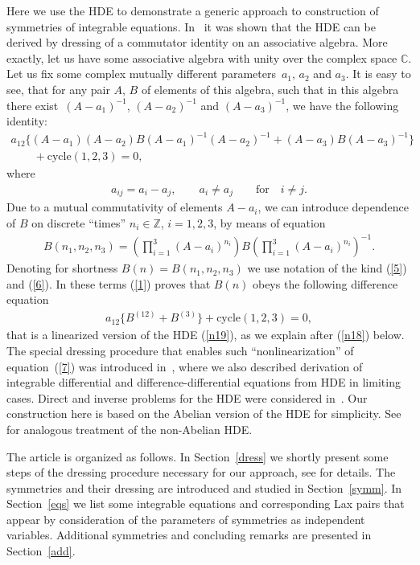 \documentclass[pdftex]{sigma}
\numberwithin{equation}{section}
\begin{document}
Here we use the HDE to demonstrate a generic approach to construction of symmetries of integrable equations. In~\cite{Pogrebkov2011} it was shown that the HDE can be derived by dressing of a commutator identity on an associative algebra. More exactly, let us have some associative algebra with unity over the complex space $\mathbb{C}$. Let us f\/ix some complex mutually dif\/ferent parameters~$a_1$, $a_2$ and $a_3$. It is easy to see, that for any pair $A$, $B$ of elements of this algebra, such that in this algebra there exist~$(A-a_1)^{-1}$, $ (A-a_2)^{-1}$ and $(A-a_3)^{-1}$, we have the following identity:
\begin{gather}
a_{12} \big\{(A-a_1)(A-a_2)B(A-a_1)^{-1}(A-a_2)^{-1}+(A-a_3)B(A-a_3)^{-1}\big\}\nonumber\\
\qquad {}+\text{cycle}(1,2,3)=0,\label{1}
\end{gather}
where
\begin{gather}
 a_{ij}=a_{i}-a_{j},\qquad a_{i}\neq a_{j}\qquad\text{for}\quad i\neq{j}.\label{8}
\end{gather}
Due to a mutual commutativity of elements $A-a_i$, we can introduce dependence of $B$ on discrete ``times'' $n_i\in\mathbb{Z}$, $i=1,2,3$, by means of equation
\begin{gather}
 B(n_1,n_2,n_3)=\left(\prod_{i=1}^{3}(A-a_i)^{n_i}\right)B\left(\prod_{i=1}^{3}(A-a_i)^{n_i}\right)^{-1}.\label{4}
\end{gather}
Denoting for shortness $B(n)=B(n_1,n_2,n_3)$ we use notation of the kind (\ref{5}) and (\ref{6}). In these terms (\ref{1}) proves that $B(n)$ obeys the following dif\/ference equation
\begin{gather}
a_{12}\big\{B^{(12)}+B^{(3)}\big\}+\text{cycle}(1,2,3)=0,\label{7}
\end{gather}
that is a linearized version of the HDE (\ref{n19}), as we explain after (\ref{n18}) below. The special dressing procedure that enables such ``nonlinearization'' of equation~(\ref{7}) was introduced in~\cite{Pogrebkov2011}, where we also described derivation of integrable dif\/ferential and dif\/ference-dif\/ferential equations from HDE in limiting cases. Direct and inverse problems for the HDE were considered in~\cite{Pogrebkov2014}. Our construction here is based on the Abelian version of the HDE for simplicity. See~\cite{Pogrebkov2016} for analogous treatment of the non-Abelian HDE.

The article is organized as follows. In Section~\ref{dress} we shortly present some steps of the dressing procedure necessary for our approach, see \cite{Pogrebkov2011} for details. The symmetries and their dressing are introduced and studied in Section~\ref{symm}. In Section~\ref{eqs} we list some integrable equations and corresponding Lax pairs that appear by consideration of the parameters of symmetries as independent variables. Additional symmetries and concluding remarks are presented in Section~\ref{add}.
\end{document}
